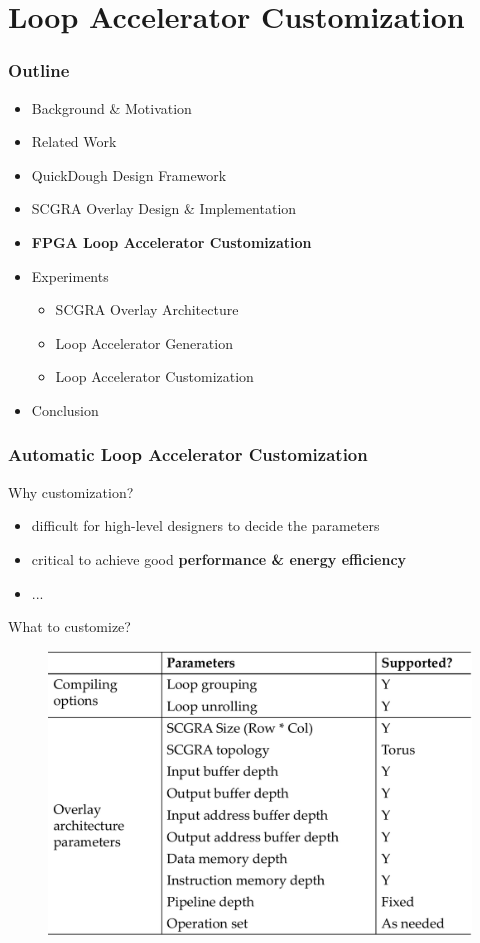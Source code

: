 \documentclass[accentcolor=tud1a,colorbacktitle,inverttitle,landscape,german,presentation,t]{tudbeamer}
\begin{document}
\section{Loop Accelerator Customization}
  \begin{frame}
  \frametitle{Outline}
  \begin{itemize}
  \setlength{\itemsep}{6pt}
  \item Background \& Motivation
  \item Related Work
  \item QuickDough Design Framework
  \item SCGRA Overlay Design \& Implementation
  \item \textbf{FPGA Loop Accelerator Customization}
  \item Experiments
  \begin{itemize}
    \setlength{\itemsep}{6pt}
    \item SCGRA Overlay Architecture
    \item Loop Accelerator Generation
    \item Loop Accelerator Customization
  \end{itemize}
  \item Conclusion
  \end{itemize}
  \end{frame}

  \begin{frame}
  \frametitle{Automatic Loop Accelerator Customization}
  \vspace{-1em}
  Why customization?
  \begin{itemize}
    \item difficult for high-level designers to decide the parameters
    \item critical to achieve good \textbf{performance \& energy efficiency}
    \item ...
  \end{itemize}

  \vspace{0.1em}
  What to customize?
  \begin{figure}
     \includegraphics[width=.7\linewidth]{custom-para}
  \end{figure}
  \end{frame}
\end{document}
